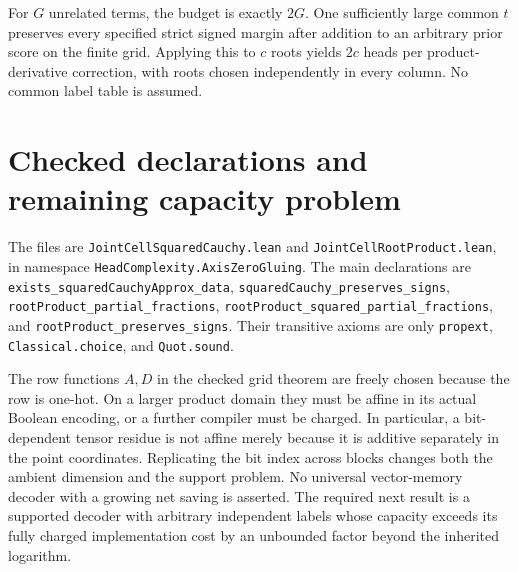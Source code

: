 \documentclass[11pt]{article}
\begin{document}
For $G$ unrelated terms, the budget is exactly $2G$. One sufficiently
large common $t$ preserves every specified strict signed margin after
addition to an arbitrary prior score on the finite grid. Applying this to
$c$ roots yields $2c$ heads per product-derivative correction, with roots
chosen independently in every column. No common label table is assumed.

\section{Checked declarations and remaining capacity problem}
The files are \texttt{JointCellSquaredCauchy.lean} and
\texttt{JointCellRootProduct.lean}, in namespace
\texttt{HeadComplexity.AxisZeroGluing}. The main declarations are
\texttt{exists\_squaredCauchyApprox\_data},
\texttt{squaredCauchy\_preserves\_signs},
\texttt{rootProduct\_partial\_fractions},
\texttt{rootProduct\_squared\_partial\_fractions}, and
\texttt{rootProduct\_preserves\_signs}.
Their transitive axioms are only \texttt{propext},
\texttt{Classical.choice}, and \texttt{Quot.sound}.

The row functions $A,D$ in the checked grid theorem are freely chosen
because the row is one-hot. On a larger product domain they must be affine
in its actual Boolean encoding, or a further compiler must be charged.
In particular, a bit-dependent tensor residue is not affine merely because
it is additive separately in the point coordinates. Replicating the bit
index across blocks changes both the ambient dimension and the support
problem. No universal vector-memory decoder with a growing net saving is
asserted. The required next result is a supported decoder with arbitrary
independent labels whose capacity exceeds its fully charged implementation
cost by an unbounded factor beyond the inherited logarithm.
\end{document}
